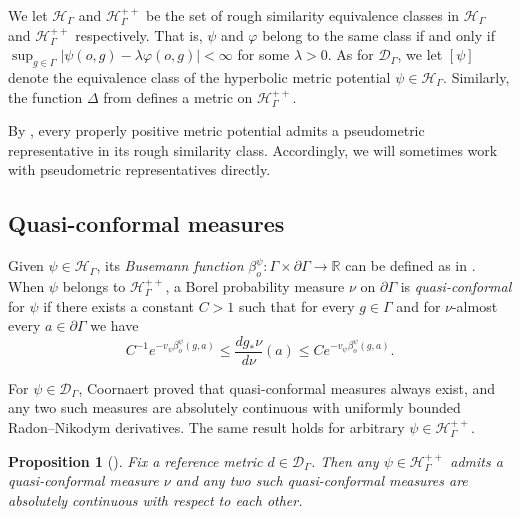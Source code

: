 \documentclass[twoside]{amsart}
\newtheorem{proposition}[theorem]{Proposition}
\theoremstyle{definition}
\numberwithin{equation}{section}
\numberwithin{theorem}{section}
\newcommand{\R}{\mathbb{R}}
\newcommand{\calD}{\mathcal{D}}
\newcommand{\Dc}{{\mathcal D}}
\newcommand{\calH}{\mathcal{H}}
\newcommand{\scrD}{\mathscr{D}}
\newcommand{\scrH}{\mathscr{H}}
\newcommand{\G}{\Gamma}
\newcommand{\Del}{\Delta}
\newcommand{\lam}{\lambda}
\newcommand{\p}{\psi}
\newcommand{\ra}{\rightarrow}
\begin{document}
We let $\scrH_\G$ and $\scrH_\G^{++}$ be the set of rough similarity equivalence classes in $\calH_\G$ and $\calH_\G^{++}$ respectively. That is, $\p$ and $\varphi$ belong to the same class if and only if $\sup_{g\in \G}|\p(o,g)-\lam \varphi(o,g)|<\infty$ for some $\lam>0$. As for $\scrD_\G$, we let $[\p]$ denote the equivalence class of the hyperbolic metric potential $\p\in \calH_\G$. Similarly, the function $\Del$ from  defines a metric on $\scrH_\G^{++}$. 

By , every properly positive metric potential admits a pseudometric representative in its rough similarity class. Accordingly, we will sometimes work with pseudometric representatives directly.



\subsection{Quasi-conformal measures}\label{subsec:QC}

Given $\p\in \calH_\G$, its \emph{Busemann function} $\beta^\p_o:\G \times \partial \G\ra \R$ can be defined as in . When $\p$ belongs to $\calH^{++}_\G$, a Borel probability measure
$\nu$ on $\partial \G$ is \emph{quasi-conformal} for $\p$ if there exists
a constant $C>1$ such that for every $g \in \G$ and for $\nu$-almost every
$a \in \partial \G$ we have
\begin{equation}\label{eq:defquasiconformal}
C^{-1} e^{-v_\p \beta_o^\p(g,a)}
\leq \frac{dg_*\nu}{d\nu}(a)
\leq C e^{-v_\p \beta_o^\p(g,a)}.
\end{equation}


 For $\p\in \calD_\G$, Coornaert \cite{coornaert} proved that quasi-conformal measures always exist, and any two such measures are absolutely continuous with uniformly bounded Radon--Nikodym derivatives. The same result holds for arbitrary $\p\in \calH_\G^{++}$.



\begin{proposition}[{\cite[Proposition 3.19]{CRS}}]
    Fix a reference metric $d \in \Dc_\G$. Then any $\p\in \calH_\G^{++}$ 
    admits a quasi-conformal measure $\nu$ and any two such quasi-conformal measures are absolutely continuous with respect to each other.  
\end{proposition}
\end{document}
